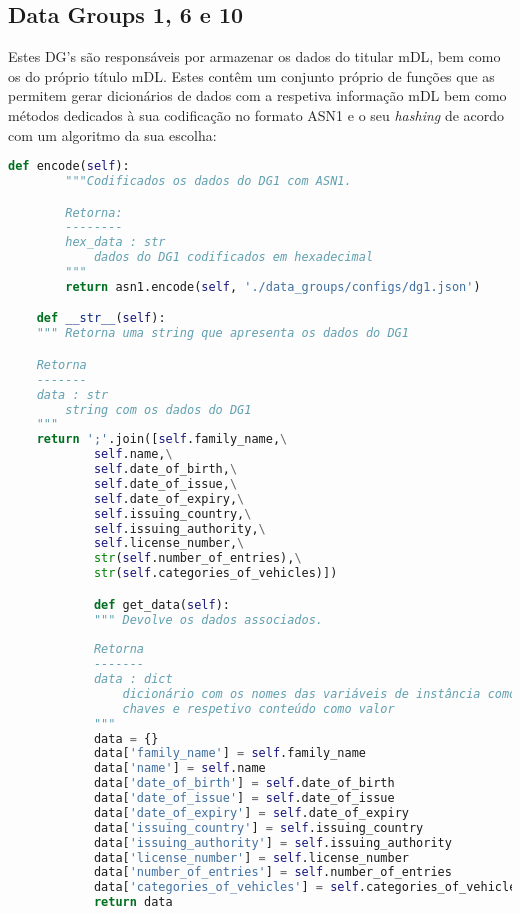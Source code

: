 \subsection{Data Groups 1, 6 e 10}

Estes DG's são responsáveis por armazenar os dados do titular mDL, bem como os do próprio título mDL. Estes contêm um conjunto próprio de funções que as permitem gerar dicionários de dados com a respetiva informação mDL bem como métodos dedicados à sua codificação no formato ASN1 e o seu \textit{hashing} de acordo com um algoritmo da sua escolha:

\begin{lstlisting}[caption=API comum aos DG's exemplificada pelo DG1, language=Python]
    def encode(self):
        """Codificados os dados do DG1 com ASN1.

        Retorna:
        --------
        hex_data : str
            dados do DG1 codificados em hexadecimal
        """
        return asn1.encode(self, './data_groups/configs/dg1.json')

    def __str__(self):
    """ Retorna uma string que apresenta os dados do DG1

    Retorna
    -------
    data : str
        string com os dados do DG1
    """
    return ';'.join([self.family_name,\
            self.name,\
            self.date_of_birth,\
            self.date_of_issue,\
            self.date_of_expiry,\
            self.issuing_country,\
            self.issuing_authority,\
            self.license_number,\
            str(self.number_of_entries),\
            str(self.categories_of_vehicles)])

            def get_data(self):
            """ Devolve os dados associados.
    
            Retorna
            -------
            data : dict
                dicionário com os nomes das variáveis de instância como
                chaves e respetivo conteúdo como valor
            """
            data = {}
            data['family_name'] = self.family_name
            data['name'] = self.name
            data['date_of_birth'] = self.date_of_birth
            data['date_of_issue'] = self.date_of_issue
            data['date_of_expiry'] = self.date_of_expiry
            data['issuing_country'] = self.issuing_country
            data['issuing_authority'] = self.issuing_authority
            data['license_number'] = self.license_number
            data['number_of_entries'] = self.number_of_entries
            data['categories_of_vehicles'] = self.categories_of_vehicles
            return data
    

\end{lstlisting}
